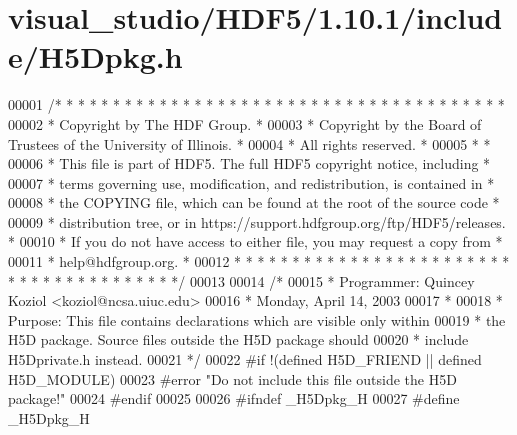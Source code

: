 \hypertarget{visual__studio_2_h_d_f5_21_810_81_2include_2_h5_dpkg_8h_source}{}\section{visual\+\_\+studio/\+H\+D\+F5/1.10.1/include/\+H5\+Dpkg.h}
\label{visual__studio_2_h_d_f5_21_810_81_2include_2_h5_dpkg_8h_source}

\begin{DoxyCode}
00001 \textcolor{comment}{/* * * * * * * * * * * * * * * * * * * * * * * * * * * * * * * * * * * * * * *}
00002 \textcolor{comment}{ * Copyright by The HDF Group.                                               *}
00003 \textcolor{comment}{ * Copyright by the Board of Trustees of the University of Illinois.         *}
00004 \textcolor{comment}{ * All rights reserved.                                                      *}
00005 \textcolor{comment}{ *                                                                           *}
00006 \textcolor{comment}{ * This file is part of HDF5.  The full HDF5 copyright notice, including     *}
00007 \textcolor{comment}{ * terms governing use, modification, and redistribution, is contained in    *}
00008 \textcolor{comment}{ * the COPYING file, which can be found at the root of the source code       *}
00009 \textcolor{comment}{ * distribution tree, or in https://support.hdfgroup.org/ftp/HDF5/releases.  *}
00010 \textcolor{comment}{ * If you do not have access to either file, you may request a copy from     *}
00011 \textcolor{comment}{ * help@hdfgroup.org.                                                        *}
00012 \textcolor{comment}{ * * * * * * * * * * * * * * * * * * * * * * * * * * * * * * * * * * * * * * */}
00013 
00014 \textcolor{comment}{/*}
00015 \textcolor{comment}{ * Programmer:  Quincey Koziol <koziol@ncsa.uiuc.edu>}
00016 \textcolor{comment}{ *      Monday, April 14, 2003}
00017 \textcolor{comment}{ *}
00018 \textcolor{comment}{ * Purpose: This file contains declarations which are visible only within}
00019 \textcolor{comment}{ *      the H5D package.  Source files outside the H5D package should}
00020 \textcolor{comment}{ *      include H5Dprivate.h instead.}
00021 \textcolor{comment}{ */}
00022 \textcolor{preprocessor}{#if !(defined H5D\_FRIEND || defined H5D\_MODULE)}
00023 \textcolor{preprocessor}{#error "Do not include this file outside the H5D package!"}
00024 \textcolor{preprocessor}{#endif}
00025 
00026 \textcolor{preprocessor}{#ifndef \_H5Dpkg\_H}
00027 \textcolor{preprocessor}{#define \_H5Dpkg\_H}

\end{DoxyCode}
